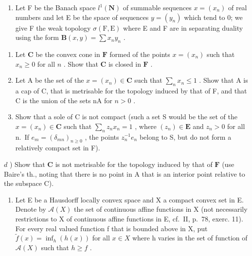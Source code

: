 \begin{enumerate}
\def\labelenumi{\arabic{enumi})}
\setcounter{enumi}{36}
\tightlist
\item
  Let F be the Banach space \(l^{1}(\mathbf{N})\) of summable sequences \(x = (x_{n})\) of real numbers and let E be the space of sequences \(y = (y_{n})\) which tend to 0; we give F the weak topology \(\sigma(\mathrm{F}, \mathrm{E})\) where E and F are in separating duality using the form \(\mathbf{B}(x, y) = \sum x_{n} y_{n}\) .
\end{enumerate}

\begin{enumerate}
\def\labelenumi{\alph{enumi})}
\item
  Let \(\mathbf{C}\) be the convex cone in \(\mathbf{F}\) formed of the points \(x = (x_{n})\) such that \(x_{n} \geqslant 0\) for all \(n\) . Show that \(\mathbf{C}\) is closed in \(\mathbf{F}\) .
\item
  Let A be the set of the \(x = (x_{n}) \in \mathbf{C}\) such that \(\sum_{n} x_{n} \leqslant 1\) . Show that A is a cap of C, that is metrisable for the topology induced by that of F, and that C is the union of the sets nA for \(n > 0\) .
\item
  Show that a sole of C is not compact (such a set S would be the set of the \(x = (x_{n}) \in \mathbf{C}\) such that \(\sum_{n} z_{n} x_{n} = 1\) , where \((z_{n}) \in \mathbf{E}\) and \(z_{n} > 0\) for all n.~If \(e_{m} = (\delta_{mn})_{n \geqslant 0}\) , the points \(z_{n}^{-1} e_{n}\) belong to S, but do not form a relatively compact set in F).
\end{enumerate}

\(d\) ) Show that \(\mathbf{C}\) is not metrisable for the topology induced by that of \(\mathbf{F}\) (use Baire's th., noting that there is no point in A that is an interior point relative to the subspace C).

\begin{enumerate}
\def\labelenumi{\arabic{enumi})}
\setcounter{enumi}{37}
\tightlist
\item
  Let E be a Hausdorff locally convex space and X a compact convex set in E. Denote by \(\mathcal{A}(X)\) the set of continuous affine functions in X (not necessarily restrictions to X of continuous affine functions in E, cf.~II, p.~78, exerc. 11). For every real valued function f that is bounded above in X, put \(\tilde{f}(x) = \inf_{h}(h(x))\) for all \(x \in X\) where h varies in the set of function of \(\mathcal{A}(X)\) such that \(h \geqslant f\) .
\end{enumerate}

